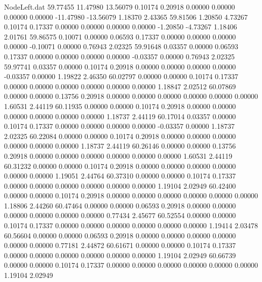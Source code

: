 \begin{filecontents}{NodeLeft.dat}
  59.77455   11.47980   13.56079     0.10174    0.20918    0.00000    0.00000    0.00000    0.00000  -11.47980  -13.56079    1.18370    2.43365
  59.81506    1.20850    4.73267     0.10174    0.17337    0.00000    0.00000    0.00000    0.00000   -1.20850   -4.73267    1.18406    2.01761
  59.86575    0.10071    0.00000     0.06593    0.17337    0.00000    0.00000    0.00000    0.00000   -0.10071    0.00000    0.76943    2.02325
  59.91648    0.03357    0.00000     0.06593    0.17337    0.00000    0.00000    0.00000    0.00000   -0.03357    0.00000    0.76943    2.02325
  59.97741    0.03357    0.00000     0.10174    0.20918    0.00000    0.00000    0.00000    0.00000   -0.03357    0.00000    1.19822    2.46350
  60.02797    0.00000    0.00000     0.10174    0.17337    0.00000    0.00000    0.00000    0.00000    0.00000    0.00000    1.18847    2.02512
  60.07869    0.00000    0.00000     0.13756    0.20918    0.00000    0.00000    0.00000    0.00000    0.00000    0.00000    1.60531    2.44119
  60.11935    0.00000    0.00000     0.10174    0.20918    0.00000    0.00000    0.00000    0.00000    0.00000    0.00000    1.18737    2.44119
  60.17014    0.03357    0.00000     0.10174    0.17337    0.00000    0.00000    0.00000    0.00000   -0.03357    0.00000    1.18737    2.02325
  60.22084    0.00000    0.00000     0.10174    0.20918    0.00000    0.00000    0.00000    0.00000    0.00000    0.00000    1.18737    2.44119
  60.26146    0.00000    0.00000     0.13756    0.20918    0.00000    0.00000    0.00000    0.00000    0.00000    0.00000    1.60531    2.44119
  60.31232    0.00000    0.00000     0.10174    0.20918    0.00000    0.00000    0.00000    0.00000    0.00000    0.00000    1.19051    2.44764
  60.37310    0.00000    0.00000     0.10174    0.17337    0.00000    0.00000    0.00000    0.00000    0.00000    0.00000    1.19104    2.02949
  60.42400    0.00000    0.00000     0.10174    0.20918    0.00000    0.00000    0.00000    0.00000    0.00000    0.00000    1.18806    2.44260
  60.47464    0.00000    0.00000     0.06593    0.20918    0.00000    0.00000    0.00000    0.00000    0.00000    0.00000    0.77434    2.45677
  60.52554    0.00000    0.00000     0.10174    0.17337    0.00000    0.00000    0.00000    0.00000    0.00000    0.00000    1.19414    2.03478
  60.56604    0.00000    0.00000     0.06593    0.20918    0.00000    0.00000    0.00000    0.00000    0.00000    0.00000    0.77181    2.44872
  60.61671    0.00000    0.00000     0.10174    0.17337    0.00000    0.00000    0.00000    0.00000    0.00000    0.00000    1.19104    2.02949
  60.66739    0.00000    0.00000     0.10174    0.17337    0.00000    0.00000    0.00000    0.00000    0.00000    0.00000    1.19104    2.02949

\end{filecontents}
